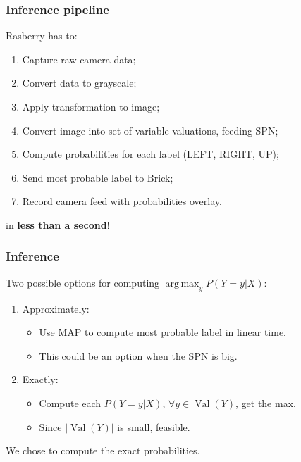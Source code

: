 \documentclass{beamer}
\DeclareMathOperator*{\argmax}{arg\,max}
\DeclareMathOperator*{\Val}{\text{Val}}
\begin{document}
\begin{frame}
  \frametitle{Inference pipeline}

  Rasberry has to:

  \begin{enumerate}
    \item Capture raw camera data;
    \item Convert data to grayscale;
    \item Apply transformation to image;
    \item Convert image into set of variable valuations, feeding SPN;
    \item Compute probabilities for each label (LEFT, RIGHT, UP);
    \item Send most probable label to Brick;
    \item Record camera feed with probabilities overlay.
  \end{enumerate}

  in \textbf{less than a second}!
\end{frame}

\begin{frame}
  \frametitle{Inference}

  Two possible options for computing $\argmax_y P(Y=y|X)$:
  \vfill

  \begin{enumerate}
    \item Approximately:\\
      \begin{itemize}
        \item Use MAP to compute most probable label in linear time.
        \item This could be an option when the SPN is big.
      \end{itemize}
    \item Exactly:\\
      \begin{itemize}
        \item Compute each $P(Y=y|X)$, $\forall y\in\Val(Y)$, get the max.
        \item Since $|\Val(Y)|$ is small, feasible.
      \end{itemize}
  \end{enumerate}
  \vfill

  We chose to compute the exact probabilities.
\end{frame}
\end{document}
